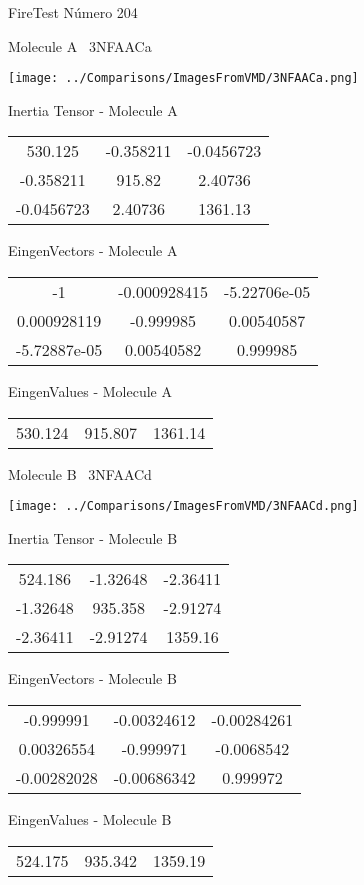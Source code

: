\vtab[-3cm]
\begin{center}
{\large FireTest \tab Número 204}
\end{center}
\begin{multicols}{2}
\begin{center}

Molecule A \
3NFAACa

\texttt{[image: ../Comparisons/ImagesFromVMD/3NFAACa.png]}

Inertia Tensor - Molecule A \\
\begin{tabular}{|c c c|}
530.125	 & 	-0.358211	 & 	-0.0456723	 \\
-0.358211	 & 	915.82	 & 	2.40736	 \\
-0.0456723	 & 	2.40736	 & 	1361.13
\end{tabular}

\vtab
 EingenVectors - Molecule A     \\
\begin{tabular}{|c c c|}
-1	 & 	-0.000928415	 & 	-5.22706e-05	 \\
0.000928119	 & 	-0.999985	 & 	0.00540587	 \\
-5.72887e-05	 & 	0.00540582	 & 	0.999985
\end{tabular}

\vtab
 EingenValues - Molecule A     \\
\begin{tabular}{|c c c|}
530.124	 & 	915.807	 & 	1361.14	 \\
\end{tabular}
\columnbreak

Molecule B \
3NFAACd

\texttt{[image: ../Comparisons/ImagesFromVMD/3NFAACd.png]}

Inertia Tensor - Molecule B \\
\begin{tabular}{|c c c|}
524.186	 & 	-1.32648	 & 	-2.36411	 \\
-1.32648	 & 	935.358	 & 	-2.91274	 \\
-2.36411	 & 	-2.91274	 & 	1359.16
\end{tabular}

\vtab
 EingenVectors - Molecule B     \\
\begin{tabular}{|c c c|}
-0.999991	 & 	-0.00324612	 & 	-0.00284261	 \\
0.00326554	 & 	-0.999971	 & 	-0.0068542	 \\
-0.00282028	 & 	-0.00686342	 & 	0.999972
\end{tabular}

\vtab
 EingenValues - Molecule B     \\
\begin{tabular}{|c c c|}
524.175	 & 	935.342	 & 	1359.19	 \\
\end{tabular}

\end{center}
\end{multicols}


